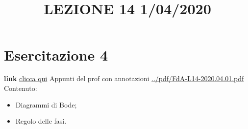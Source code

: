 \section{Esercitazione 4}
\title{LEZIONE 14 1/04/2020}\newline
\textbf{link} \href{https://web.microsoftstream.com/video/7cfe3714-fd1e-453f-8394-f7abd4d747ad?list=user&userId=faa91214-a6f5-40d7-8875-253fd49b8ce1}{clicca qui}\newline
\newline
Appunti del prof con annotazioni \url{../pdf/FdA-L14-2020.04.01.pdf}
Contenuto:
\begin{itemize}
    \item Diagrammi di Bode;
    \item Regolo delle fasi.
\end{itemize}